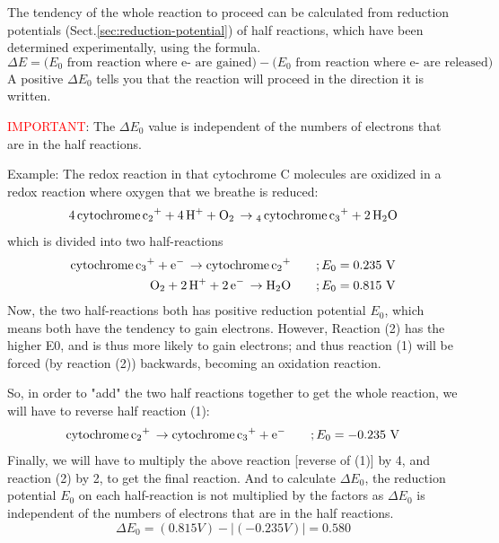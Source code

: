 The tendency of the whole reaction to proceed can be calculated from reduction
potentials (Sect.\ref{sec:reduction-potential}) of half reactions, which have
been determined experimentally, using the formula.
\begin{equation}
\Delta E = (E_0 \text{ from reaction where e- are gained)} - (E_0 \text{ from
reaction where e- are released)}
\end{equation}
A positive $\Delta E_0$ tells you that the reaction will proceed in the
direction it is written.

\textcolor{red}{IMPORTANT}: The $\Delta E_0$ value is independent of the numbers
of electrons that are in the half reactions.

Example: The redox reaction in that cytochrome C molecules are oxidized in a
redox reaction where oxygen that we breathe is reduced:
\begin{equation}
\ce{4 cytochrome c_2+ + 4 H+ + O2 \rightarrow 4 cytochrome c_3+ + 2 H2O}
\end{equation}
which is divided into two half-reactions
\begin{equation}
\begin{split}
\ce{cytochrome c_3+ + e- \rightarrow cytochrome c_2+} \qquad; E_0 = 0.235 \text{
V} \\
\ce{O2 + 2 H+ + 2 e- \rightarrow H2O} \qquad; E_0 = 0.815 \text{ V}
\end{split}
\end{equation}
Now, the two half-reactions both has positive reduction potential $E_0$, which
means both have the tendency to gain electrons. However,
Reaction (2) has the higher E0, and is thus more likely to gain electrons; and
thus reaction (1) will be forced (by reaction (2)) backwards, becoming an
oxidation reaction.

So, in order to "add" the two half reactions together to get the whole reaction,
we will have to reverse half reaction (1):
\begin{equation}
\ce{cytochrome c_2+ \rightarrow cytochrome c_3+ + e- } \qquad; E_0 = -0.235
\text{ V}
\end{equation}
Finally, we will have to multiply the above reaction [reverse of (1)] by 4, and
reaction (2) by 2, to get the final reaction. And to calculate $\Delta E_0$, the
reduction potential $E_0$ on each half-reaction is not multiplied by the factors
as $\Delta E_0$ is independent of the numbers of electrons that are in the half
reactions.
\begin{equation}
\Delta E_0	= (0.815 V) - |(- 0.235 V)| = 0.580
\end{equation}


